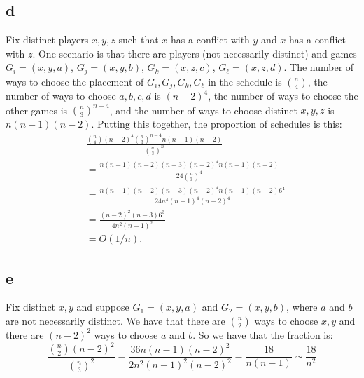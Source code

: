 \documentclass[]{article}
\theoremstyle{definition}
\numberwithin{theorem}{section}
\numberwithin{equation}{section}
\begin{document}
\subsection{d}
Fix distinct players $x, y, z$ such that $x$ has a conflict with $y$ and $x$ has a conflict with $z$. One scenario is that there are players (not necessarily distinct) and games $G_i = (x, y, a)$, $G_j = (x, y, b)$, $G_k = (x, z, c)$, $G_\ell = (x, z, d)$. 
The number of ways to choose the placement of $G_i, G_j, G_k, G_\ell$ in the schedule is $\binom{n}{4}$, the number of ways to choose $a, b, c, d$ is $(n - 2)^4$, the number of ways to choose the other games is $\binom{n}{3}^{n - 4}$, and the number of ways to choose distinct $x, y, z$ is $n(n - 1)(n-2)$. Putting this together, the proportion of schedules is this:
\begin{align*}
	&\frac{\binom{n}{4} (n-2)^4 \binom{n}{3}^{n - 4} n (n-1)(n-2)}{\binom{n}{3}^n}\\
	&= \frac{n(n-1)(n-2)(n-3) (n-2)^4 n (n-1)(n-2)}{24 \binom{n}{3}^4}\\
	&= \frac{n(n-1)(n-2)(n-3) (n-2)^4 n (n-1)(n-2) 6^4 }{24 n^4 (n-1)^4 (n-2)^4}\\
	&= \frac{(n - 2)^2 (n - 3) 6^3}{4 n^2 (n-1)^2}\\
	&= O(1/n).
\end{align*}

\subsection{e}
Fix distinct $x, y$ and suppose $G_1 = (x, y, a)$ and $G_2 = (x, y, b)$, where $a $ and $b$ are not necessarily distinct. We have that there are $\binom{n}{2}$ ways to choose $x,y$ and there are $(n-2)^2$ ways to choose $a$ and $b$. So we have that the fraction is:
\begin{equation}
	\frac{\binom{n}{2} (n - 2)^2}{\binom{n}{3}^2} = \frac{36 n (n-1) (n-2)^2 }{2 n^2 (n-1)^2(n-2)^2} = \frac{18}{n (n-1)} \sim \frac{18}{n^2}
\end{equation}
\end{document}
